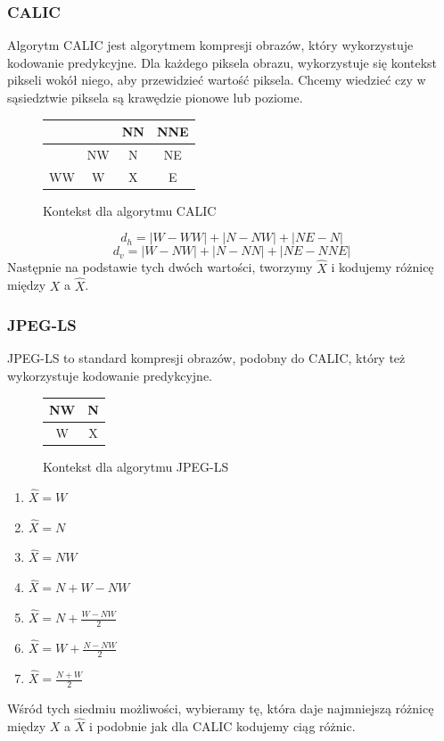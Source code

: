 \documentclass{../notatki}
\begin{document}
\subsubsection{CALIC}

Algorytm CALIC jest algorytmem kompresji obrazów, który wykorzystuje
kodowanie predykcyjne. Dla każdego piksela obrazu, wykorzystuje się kontekst
pikseli wokół niego, aby przewidzieć wartość piksela. Chcemy wiedzieć czy w
sąsiedztwie piksela są krawędzie pionowe lub poziome.
\begin{figure}[h]
  \centering
  \begin{tabular}{|c|c|c|c|}
    \hline
    & & NN & NNE \\
    \hline
    & NW & N & NE \\
    \hline
    WW & W & \color{red} X & E \\
    \hline
  \end{tabular}
  \caption{Kontekst dla algorytmu CALIC}
\end{figure}
$$
d_h = |W - WW| + |N - NW| + |NE - N|
$$
$$
d_v = |W - NW| + |N - NN| + |NE - NNE|
$$
Następnie na podstawie tych dwóch wartości, tworzymy $\widehat{X}$ i kodujemy
różnicę między $X$ a $\widehat{X}$.

\subsubsection{JPEG-LS}

JPEG-LS to standard kompresji obrazów, podobny do CALIC, który też
wykorzystuje
kodowanie predykcyjne.
\begin{figure}[h]
  \centering
  \begin{tabular}{|c|c|}
    \hline
    NW & N \\
    \hline
    W & \color{red} X \\
    \hline
  \end{tabular}
  \caption{Kontekst dla algorytmu JPEG-LS}
\end{figure}
\begin{enumerate}
  \item $\widehat{X} = W$
  \item $\widehat{X} = N$
  \item $\widehat{X} = NW$
  \item $\widehat{X} = N + W - NW$
  \item $\widehat{X} = N + \frac{W - NW}{2}$
  \item $\widehat{X} = W + \frac{N - NW}{2}$
  \item $\widehat{X} = \frac{N + W}{2}$
\end{enumerate}
Wśród tych siedmiu możliwości, wybieramy tę, która daje najmniejszą różnicę
między $X$ a $\widehat{X}$ i podobnie jak dla CALIC kodujemy ciąg różnic.
\end{document}
